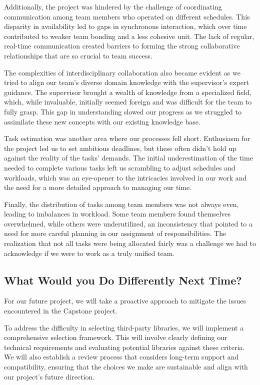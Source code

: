 \documentclass{article}
\begin{document}
Additionally, the project was hindered by the challenge of coordinating communication among team members who operated on different schedules. This disparity in availability led to gaps in synchronous interaction, which over time contributed to weaker team bonding and a less cohesive unit. The lack of regular, real-time communication created barriers to forming the strong collaborative relationships that are so crucial to team success.

The complexities of interdisciplinary collaboration also became evident as we tried to align our team’s diverse domain knowledge with the supervisor's expert guidance. The supervisor brought a wealth of knowledge from a specialized field, which, while invaluable, initially seemed foreign and was difficult for the team to fully grasp. This gap in understanding slowed our progress as we struggled to assimilate these new concepts with our existing knowledge base.

Task estimation was another area where our processes fell short. Enthusiasm for the project led us to set ambitious deadlines, but these often didn't hold up against the reality of the tasks' demands. The initial underestimation of the time needed to complete various tasks left us scrambling to adjust schedules and workloads, which was an eye-opener to the intricacies involved in our work and the need for a more detailed approach to managing our time.

Finally, the distribution of tasks among team members was not always even, leading to imbalances in workload. Some team members found themselves overwhelmed, while others were underutilized, an inconsistency that pointed to a need for more careful planning in our assignment of responsibilities. The realization that not all tasks were being allocated fairly was a challenge we had to acknowledge if we were to work as a truly unified team.

\subsection{What Would you Do Differently Next Time?}
For our future project, we will take a proactive approach to mitigate the issues encountered in the Capstone project.

To address the difficulty in selecting third-party libraries, we will implement a comprehensive selection framework. This will involve clearly defining our technical requirements and evaluating potential libraries against these criteria. We will also establish a review process that considers long-term support and compatibility, ensuring that the choices we make are sustainable and align with our project’s future direction.
\end{document}
